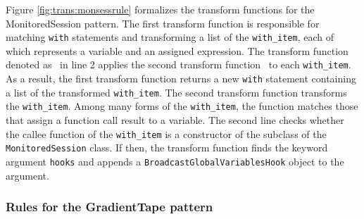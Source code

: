 
Figure \ref{fig:trans:monsessrule} formalizes the transform functions for the
MonitoredSession pattern.
The first transform function is responsible for matching {\tt with} statements
and transforming a list of the {\tt with\_item}, each of which represents a
variable and an assigned expression. 
The transform function denoted as \fkwwithitem~in line 2 applies the second
transform function \fkwithitem~to each {\tt with\_item}.
As a result, the first transform function returns a new {\tt with} statement
containing a list of the transformed {\tt with\_item}.
The second transform function transforms the {\tt with\_item}.
Among many forms of the {\tt with\_item}, the function matches those that
assign a function call result to a variable.
The second line checks whether the callee function of the {\tt with\_item} is a
constructor of the subclass of the {\tt MonitoredSession} class. 
If then, the transform function finds the keyword argument {\tt hooks} and
appends a {\tt BroadcastGlobalVariablesHook} object to the argument.\\\newpage

\subsubsection{Rules for the GradientTape pattern}\label{sec:grad}

